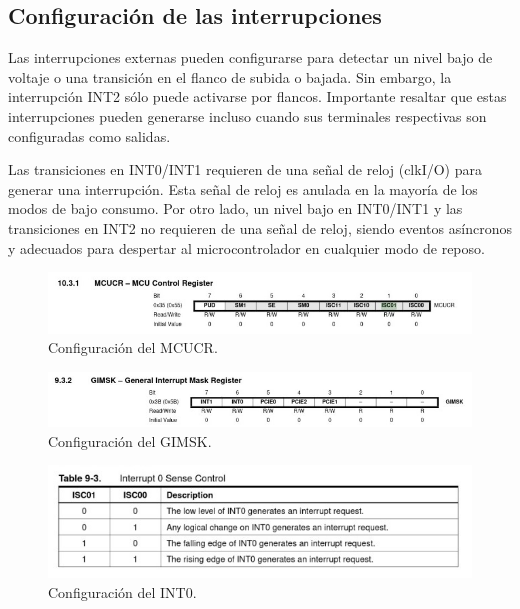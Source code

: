 \subsection{Configuración de las interrupciones}
Las interrupciones externas pueden configurarse para detectar un nivel bajo de voltaje o una transición en el flanco de subida o bajada. Sin embargo, la interrupción INT2 sólo puede activarse por flancos. Importante resaltar que estas interrupciones pueden generarse incluso cuando sus terminales respectivas son configuradas como salidas.

Las transiciones en INT0/INT1 requieren de una señal de reloj (clkI/O) para generar una interrupción. Esta señal de reloj es anulada en la mayoría de los modos de bajo consumo. Por otro lado, un nivel bajo en INT0/INT1 y las transiciones en INT2 no requieren de una señal de reloj, siendo eventos asíncronos y adecuados para despertar al microcontrolador en cualquier modo de reposo.\cite{interrupciones}
\begin{figure}[H]
    \centering
    \includegraphics[scale=0.5]{images/MCUCR.jpeg}
    \caption{Configuración del MCUCR\cite{Atmel2011}.}
    \label{fig:enter-label}
\end{figure}
\begin{figure}[H]
    \centering
    \includegraphics[scale=0.5]{images/GIMSK.jpeg}
    \caption{Configuración del GIMSK\cite{Atmel2011}.}
    \label{fig:enter-label}
\end{figure}
\begin{figure}[H]
    \centering
    \includegraphics[scale=0.5]{images/int0.jpeg}
    \caption{Configuración del INT0\cite{Atmel2011}.}
    \label{fig:enter-label}
\end{figure}
